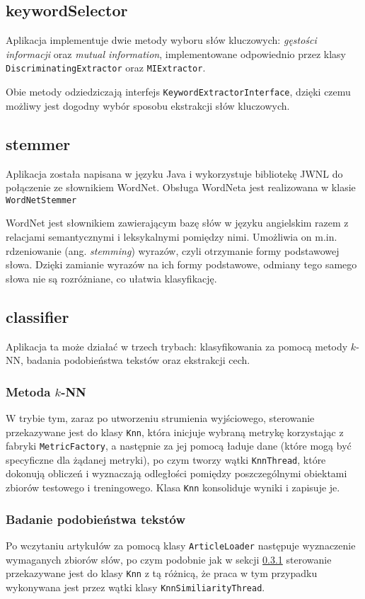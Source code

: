 \documentclass{classrep}
\begin{document}
{\subsection{keywordSelector}
Aplikacja implementuje dwie metody wyboru słów kluczowych: \textit{gęstości informacji} oraz \textit{mutual information}, implementowane odpowiednio przez klasy   \verb|DiscriminatingExtractor| oraz \verb|MIExtractor|.

Obie metody odziedziczają interfejs \verb|KeywordExtractorInterface|, dzięki czemu możliwy jest dogodny wybór sposobu ekstrakcji słów kluczowych.

\subsection{stemmer}
Aplikacja została napisana w języku Java i wykorzystuje bibliotekę JWNL do połączenie ze słownikiem WordNet. Obsługa WordNeta jest realizowana w klasie \verb|WordNetStemmer|
 
WordNet jest słownikiem zawierającym bazę słów w języku angielskim razem z relacjami semantycznymi i leksykalnymi pomiędzy nimi. Umożliwia on m.in. rdzeniowanie (ang. \textit{stemming}) wyrazów, czyli otrzymanie formy podstawowej słowa. Dzięki zamianie wyrazów na ich formy podstawowe, odmiany tego samego słowa nie są rozróżniane, co ułatwia klasyfikację.

\subsection{classifier}
Aplikacja ta może działać w trzech trybach: klasyfikowania za pomocą metody $k$-NN, badania podobieństwa tekstów oraz ekstrakcji cech.

\subsubsection{Metoda $k$-NN}
\label{sec:impl_knn}
W trybie tym, zaraz po utworzeniu strumienia wyjściowego, sterowanie przekazywane jest do klasy \verb|Knn|, która inicjuje wybraną metrykę korzystając z fabryki \verb|MetricFactory|, a następnie za jej pomocą ładuje dane (które mogą być specyficzne dla żądanej metryki), po czym tworzy wątki \verb|KnnThread|, które dokonują obliczeń i wyznaczają odległości pomiędzy poszczególnymi obiektami zbiorów testowego i treningowego. Klasa \verb|Knn| konsoliduje wyniki i zapisuje je.

\subsubsection{Badanie podobieństwa tekstów}
Po wczytaniu artykułów za pomocą klasy \verb|ArticleLoader| następuje wyznaczenie wymaganych zbiorów słów, po czym podobnie jak w sekcji \ref{sec:impl_knn} sterowanie przekazywane jest do klasy \verb|Knn| z tą różnicą, że praca w tym przypadku wykonywana jest przez wątki klasy \verb|KnnSimiliarityThread|.

}
\end{document}
